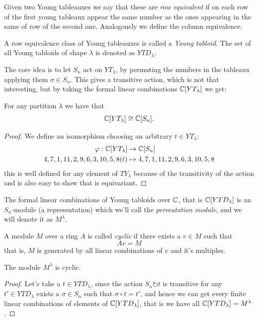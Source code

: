 \documentclass[11pt]{scrartcl}
\newcommand{\acts}{\circlearrowright}
\begin{document}
	\begin{definition}
		Given two Young tableauxes we say that these are \textit{row equivalent} if on each row of the first young tableaux appear the same number as the ones appearing in the same of row of the second one. Analogously we define the column equivalence.
	\end{definition}
	\begin{definition}
		A row equivalence class of Young tableauxes is called a \textit{Young tabloid}. The set of all Young tabloids of shape $\lambda$ is denoted as $YTD_\lambda$.
	\end{definition}
	The core idea is to let $S_n$ act on $YT_\lambda$, by permuting the numbers in the tableaux applying them $\sigma\in S_n$. This gives a transitive action, which is not that interesting, but by taking the formal linear combinations $\mathbb C[YT_\lambda]$ we get:
	\begin{lemma}
		For any partition $\lambda$ we have that
		$$\mathbb C[YT_\lambda]\cong \mathbb C[S_n].$$
	\end{lemma}
	\begin{proof}
		We define an isomorphism choosing an arbitrary $t\in YT_\lambda$:
		\begin{align*}
			\varphi: \mathbb C[YT_\lambda] & \to \mathbb C[S_n] \\
			{4,7,1,11,2,9,6,3,10,5,8}(t) &\mapsto {4,7,1,11,2,9,6,3,10,5,8}   
		\end{align*}
		this is well defined for any element of $TY_\lambda$ because of the transitivity of the action and is also easy to show that is equivariant.
	\end{proof}
	\begin{definition}
		The formal linear combinations of Young tabloids over $\mathbb C$, that is $\mathbb C[YTD_\lambda]$ is an $S_n$-module (a representation) which we'll call the \textit{permutation module}, and we will denote it as $M^\lambda$. 
	\end{definition}
	\begin{definition}
		A module $M$ over a ring $A$ is called \textit{cyclic} if there exists a $v\in M$ such that
		$$Av=M$$
		that is, $M$ is generated by all linear combinations of $v$ and it's multiples.
	\end{definition}
	\begin{proposition}
		The module $M^\lambda$ is cyclic.
	\end{proposition}
	\begin{proof}
		Let's take a $t\in YTD_\lambda$, since the action $S_n\acts t$ is transitive for any $t'\in YTD_\lambda$ exists a $\sigma\in S_n$ such that $\sigma\circ t = t'$, and hence we can get every finite linear combinations of elements of $\mathbb C[YTD_\lambda]$, that is we have all $\mathbb C[YTD_\lambda]=M^\lambda$.
	\end{proof}
\end{document}
